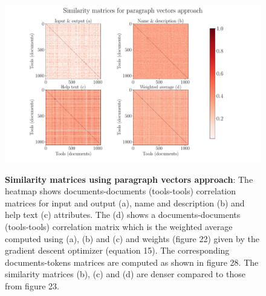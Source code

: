 \begin{figure}[h]
\begin{centering}    
    {\includegraphics[scale=0.4]{figures/Similarity_matrices_doc2vec.pdf}}
    \caption[Similarity matrices using paragraph vectors approach]{\textbf{Similarity matrices using paragraph vectors approach}: The heatmap shows documents-documents (tools-tools) correlation matrices for input and output (a), name and description (b) and help text (c) attributes. The (d) shows a documents-documents (tools-tools) correlation matrix which is the weighted average computed using (a), (b) and (c) and weights (figure 22) given by the gradient descent optimizer (equation 15). The corresponding documents-tokens matrices are computed as shown in figure 28. The similarity matrices (b), (c) and (d) are denser compared to those from figure 23.}
\end{centering}
\end{figure}

